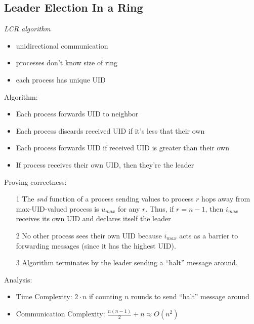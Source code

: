 \documentclass[a4paper,10pt,]{article}
\begin{document}
\subsection{Leader Election In a Ring}
\emph{LCR algorithm}
\begin{itemize}
  \item unidirectional communication
  \item processes don't know size of ring
  \item each process has unique UID
\end{itemize}
Algorithm:
\begin{itemize}
  \item Each process forwards UID to neighbor
  \item Each process discards received UID if it's less that their own
  \item Each process forwards UID if received UID is greater than their own
  \item If process receives their own UID, then they're the leader
\end{itemize}
Proving correctness:
\begin{itemize}
  \item[1] The \emph{snd} function of a process sending values to process $r$ hops away from max-UID-valued process is $u_{max}$ for any $r$.  Thus, if $r = n-1$, then $i_{max}$ receives its own UID and declares itself the leader
  \item[2] No other process sees their own UID because $i_{max}$ acts as a barrier to forwarding messages (since it has the highest UID).
  \item[3] Algorithm terminates by the leader sending a ``halt'' message around.
\end{itemize}
Analysis:
\begin{itemize}
  \item Time Complexity: $2\cdot n$ if counting $n$ rounds to send ``halt'' message around
  \item Communication Complexity: $\frac{n(n-1)}{2} + n \approx O(n^2)$
\end{itemize}
\end{document}
